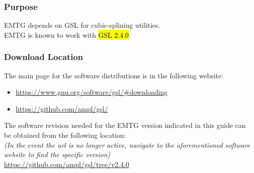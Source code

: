 
\subsubsection{Purpose}
\noindent \ac{EMTG} depends on \ac{GSL} for cubic-splining utilities. \\ \ac{EMTG} is known to work with \hl{GSL 2.4.0}. 

\subsubsection{Download Location}
\noindent The main page for the software distributions is in the following website: \\
\begin{itemize}
	\item \url{https://www.gnu.org/software/gsl/#downloading}
	\item \url{https://github.com/ampl/gsl/}
\end{itemize}
	
\noindent The software revision needed for the EMTG version indicated in this guide can be obtained from the following location: \\
\emph{(In the event the url is no longer active, navigate to the aforementioned software website to find the specific version)} \\
\url{https://github.com/ampl/gsl/tree/v2.4.0}

